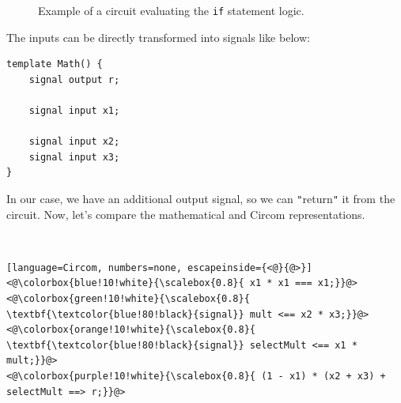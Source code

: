 \documentclass[../lecture-notes-148x210.tex]{subfiles}
\begin{document}
\begin{figure}[h!]
{
    }
    \caption{Example of a circuit evaluating the \texttt{if} statement logic.}
    \label{fig:polynomial-circuit}
\end{figure}

The inputs can be directly transformed into signals like below:
\begin{lstlisting}[language=Circom]
template Math() {
    signal output r;

    signal input x1;

    signal input x2;
    signal input x3;
}
\end{lstlisting}

In our case, we have an additional output signal, so we can \texttt{"}return\texttt{"} it from the circuit.
Now, let's compare the mathematical and Circom representations.

\newsavebox{\circomcode}

\begin{lrbox}{\circomcode}
\begin{minipage}{6cm} %
    \centering
     \\[1ex] %
    \begin{lstlisting}[language=Circom, numbers=none, escapeinside={<@}{@>}]
<@\colorbox{blue!10!white}{\scalebox{0.8}{ x1 * x1 === x1;}}@>
<@\colorbox{green!10!white}{\scalebox{0.8}{ \textbf{\textcolor{blue!80!black}{signal}} mult <== x2 * x3;}}@>
<@\colorbox{orange!10!white}{\scalebox{0.8}{ \textbf{\textcolor{blue!80!black}{signal}} selectMult <== x1 * mult;}}@>
<@\colorbox{purple!10!white}{\scalebox{0.8}{ (1 - x1) * (x2 + x3) + selectMult ==> r;}}@>
    \end{lstlisting}
\end{minipage}
\end{lrbox}
\end{document}
